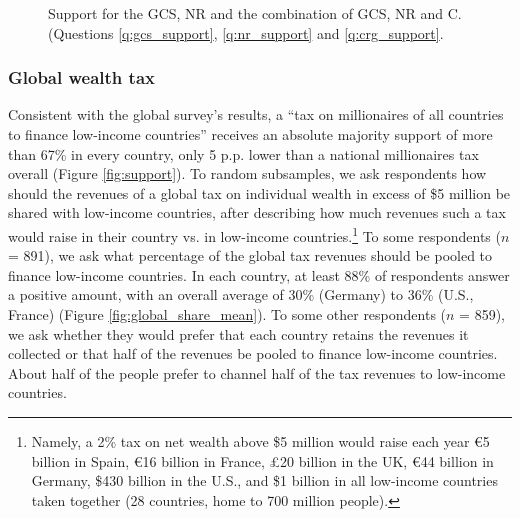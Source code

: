 \begin{figure}[h!]
    \caption[Support for the Global Climate Scheme]{Support for the GCS, NR and the combination of GCS, NR and C. (Questions \ref{q:gcs_support}, \ref{q:nr_support} and \ref{q:crg_support}.%
    }\label{fig:support_binary}
\end{figure}

\subsubsection{Global wealth tax} %
Consistent with the global survey's results, a ``tax on millionaires of all countries to finance low-income countries'' receives an absolute majority support of more than 67\% in every country, only 5 p.p. lower than a national millionaires tax overall (Figure \ref{fig:support}). %
To random subsamples, we ask respondents how should the revenues of a global tax on individual wealth in excess of \$5 million be shared with low-income countries, after describing how much revenues such a tax would raise in their country vs. in low-income countries.\footnote{Namely, a 2\% tax on net wealth above \$5 million would raise each year \euro{}5 billion in Spain, \euro{}16 billion in France, £20 billion in the UK, \euro{}44 billion in Germany, \$430 billion in the U.S., and \$1 billion in all low-income countries taken together (28 countries, home to 700 million people).} To some respondents ($n$ = 891), we ask what percentage of the global tax revenues should be pooled to finance low-income countries. In each country, at least 88\% of respondents answer a positive amount, with an overall average of 30\% (Germany) to 36\% (U.S., France) (Figure \ref{fig:global_share_mean}). To some other respondents ($n$ = 859), we ask whether they would prefer that each country retains the revenues it collected or that half of the revenues be pooled to finance low-income countries. About half of the people prefer to channel half of the tax revenues to low-income countries. 

